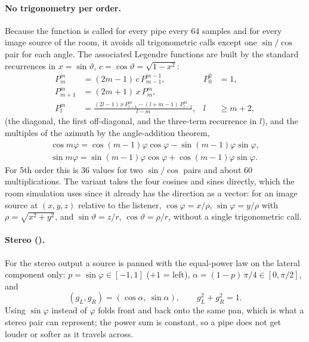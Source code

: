 \paragraph{No trigonometry per order.} Because the function is called for every pipe every 64 samples and for every
image source of the room, it avoids all trigonometric calls except one $\sin/\cos$ pair for each angle. The associated
Legendre functions are built by the standard recurrences in $x = \sin\vartheta$, $c = \cos\vartheta = \sqrt{1-x^2}$:
\begin{align}
  P_m^m &= (2m-1)\,c\,P_{m-1}^{m-1}, & P_0^0 &= 1, \\
  P_{m+1}^m &= (2m+1)\,x\,P_m^m, \\
  P_l^m &= \frac{(2l-1)\,x\,P_{l-1}^m - (l+m-1)\,P_{l-2}^m}{l-m}, & l &\ge m+2,
\end{align}
(the diagonal, the first off-diagonal, and the three-term recurrence in $l$), and the multiples of the azimuth by
the angle-addition theorem,
\begin{gather}
  \cos m\varphi = \cos(m-1)\varphi\cos\varphi - \sin(m-1)\varphi\sin\varphi,\\
  \sin m\varphi = \sin(m-1)\varphi\cos\varphi + \cos(m-1)\varphi\sin\varphi.
\end{gather}
For 5th order this is 36 values for two $\sin/\cos$ pairs and about 60 multiplications. The variant
 takes the four cosines and sines directly, which the room simulation uses since it already has
the direction as a vector: for an image source at $(x,y,z)$ relative to the listener,
$\cos\varphi = x/\rho$, $\sin\varphi = y/\rho$ with $\rho = \sqrt{x^2+y^2}$, and $\sin\vartheta = z/r$,
$\cos\vartheta=\rho/r$, without a single trigonometric call.

\paragraph{Stereo ().} For the stereo output a source is panned with the equal-power law on the
lateral component only: $p = \sin\varphi \in [-1,1]$ ($+1$ = left), $\alpha = (1-p)\,\pi/4 \in [0,\pi/2]$, and
\begin{equation}
  (g_L, g_R) = (\cos\alpha,\ \sin\alpha),\qquad g_L^2+g_R^2 = 1.
\end{equation}
Using $\sin\varphi$ instead of $\varphi$ folds front and back onto the same pan, which is what a stereo pair can
represent; the power sum is constant, so a pipe does not get louder or softer as it travels across.

